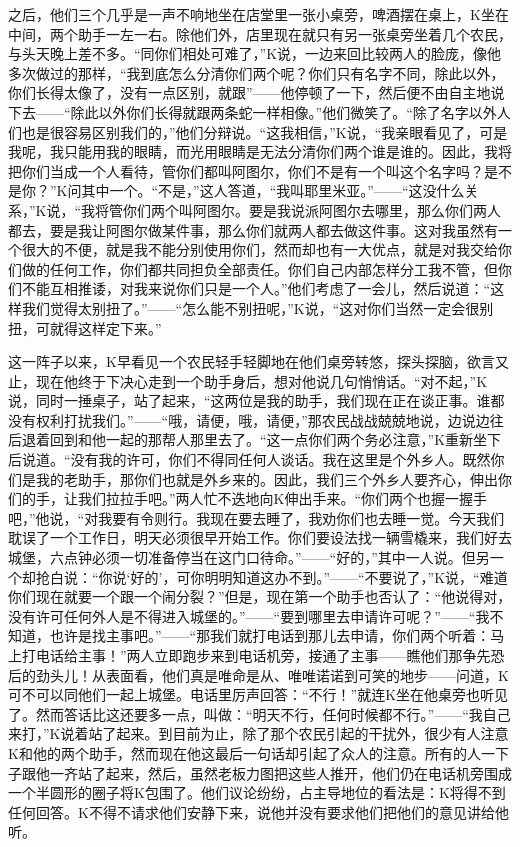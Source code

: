 \documentclass[12pt,a4paper]{article}
\begin{document}
之后，他们三个几乎是一声不响地坐在店堂里一张小桌旁，啤酒摆在桌上，K坐在中间，两个助手一左一右。除他们外，店里现在就只有另一张桌旁坐着几个农民，与头天晚上差不多。“同你们相处可难了，”K说，一边来回比较两人的脸庞，像他多次做过的那样，“我到底怎么分清你们两个呢？你们只有名字不同，除此以外，你们长得太像了，没有一点区别，就跟”——他停顿了一下，然后便不由自主地说下去——“除此以外你们长得就跟两条蛇一样相像。”他们微笑了。“除了名字以外人们也是很容易区别我们的，”他们分辩说。“这我相信，”K说，“我亲眼看见了，可是我呢，我只能用我的眼睛，而光用眼睛是无法分清你们两个谁是谁的。因此，我将把你们当成一个人看待，管你们都叫阿图尔，你们不是有一个叫这个名字吗？是不是你？”K问其中一个。“不是，”这人答道，“我叫耶里米亚。”——“这没什么关系，”K说，“我将管你们两个叫阿图尔。要是我说派阿图尔去哪里，那么你们两人都去，要是我让阿图尔做某件事，那么你们就两人都去做这件事。这对我虽然有一个很大的不便，就是我不能分别使用你们，然而却也有一大优点，就是对我交给你们做的任何工作，你们都共同担负全部责任。你们自己内部怎样分工我不管，但你们不能互相推诿，对我来说你们只是一个人。”他们考虑了一会儿，然后说道：“这样我们觉得太别扭了。”——“怎么能不别扭呢，”K说，“这对你们当然一定会很别扭，可就得这样定下来。”

这一阵子以来，K早看见一个农民轻手轻脚地在他们桌旁转悠，探头探脑，欲言又止，现在他终于下决心走到一个助手身后，想对他说几句悄悄话。“对不起，”K说，同时一捶桌子，站了起来，“这两位是我的助手，我们现在正在谈正事。谁都没有权利打扰我们。”——“哦，请便，哦，请便，”那农民战战兢兢地说，边说边往后退着回到和他一起的那帮人那里去了。“这一点你们两个务必注意，”K重新坐下后说道。“没有我的许可，你们不得同任何人谈话。我在这里是个外乡人。既然你们是我的老助手，那你们也就是外乡来的。因此，我们三个外乡人要齐心，伸出你们的手，让我们拉拉手吧。”两人忙不迭地向K伸出手来。“你们两个也握一握手吧，”他说，“对我要有令则行。我现在要去睡了，我劝你们也去睡一觉。今天我们耽误了一个工作日，明天必须很早开始工作。你们要设法找一辆雪橇来，我们好去城堡，六点钟必须一切准备停当在这门口待命。”——“好的，”其中一人说。但另一个却抢白说：“你说‘好的’，可你明明知道这办不到。”——“不要说了，”K说，“难道你们现在就要一个跟一个闹分裂？”但是，现在第一个助手也否认了：“他说得对，没有许可任何外人是不得进入城堡的。”——“要到哪里去申请许可呢？”——“我不知道，也许是找主事吧。”——“那我们就打电话到那儿去申请，你们两个听着：马上打电话给主事！”两人立即跑步来到电话机旁，接通了主事——瞧他们那争先恐后的劲头儿！从表面看，他们真是唯命是从、唯唯诺诺到可笑的地步——问道，K可不可以同他们一起上城堡。电话里厉声回答：“不行！”就连K坐在他桌旁也听见了。然而答话比这还要多一点，叫做：“明天不行，任何时候都不行。”——“我自己来打，”K说着站了起来。到目前为止，除了那个农民引起的干扰外，很少有人注意K和他的两个助手，然而现在他这最后一句话却引起了众人的注意。所有的人一下子跟他一齐站了起来，然后，虽然老板力图把这些人推开，他们仍在电话机旁围成一个半圆形的圈子将K包围了。他们议论纷纷，占主导地位的看法是：K将得不到任何回答。K不得不请求他们安静下来，说他并没有要求他们把他们的意见讲给他听。
\end{document}
